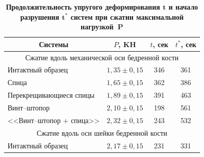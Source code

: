 \begin{table}[t]

\centering

\begin{minipage}{.73\textwidth}





\small

\centering

\caption*{\bf Продолжительность упругого деформирования $\boldsymbol t$ и начало разрушения $\boldsymbol {t^*}$ систем при сжатии максимальной нагрузкой~$\boldsymbol P$ }

\vspace{-3mm}



\begin{tabular}{l|c|c|c}

\hline

\multicolumn{1}{c|}{\footnotesize Системы} &

\footnotesize  $P$, KH & 

\footnotesize $t$, сек & 

\footnotesize $t^*$, сек \\ \hline

\multicolumn{4}{c}{\rule{0mm}{12pt}\footnotesize Сжатие вдоль механической оси бедренной кости \hypertarget{nekh:1}{}} \\ 

\hline

\rule{0mm}{12pt}%

Интактный образец & $1,35\pm0,15$ & 346	& 361 \\ %

Спица 			  &	$1,65\pm0,15$ & 362	& 386 \\ %

Перекрещивающиеся спицы	& $1,89\pm0,15$	& 391 & 463 \\ %

Винт--штопор	& $2,10\pm0,15$	& 198 &	561 \\ %

<<Винт--штопор + спица>>	& $2,32\pm0,15$	& 243 &	532 \\ \hline

\multicolumn{4}{c}{\rule{0mm}{12pt}\footnotesize Сжатие вдоль оси шейки бедренной кости \hypertarget{nekh:2}{}} \\ 

\hline

\rule{0mm}{12pt}%

Интактный образец & $2,17\pm0,15$ &	231 & 331 \\ %


\end{tabular}
\end{minipage}
\end{table}
